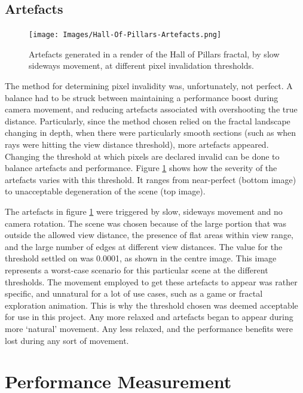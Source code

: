 \subsection{Artefacts}

\begin{figure}[ht]
	\centering
	\texttt{[image: Images/Hall-Of-Pillars-Artefacts.png]}
	\caption{Artefacts generated in a render of the Hall of Pillars fractal, by slow sideways movement, at different pixel invalidation thresholds.}
	\label{figure:hall-of-pillars-artefacts}
\end{figure}

The method for determining pixel invalidity was, unfortunately, not perfect. A balance had to be struck between maintaining a performance boost during camera movement, and reducing artefacts associated with overshooting the true distance. Particularly, since the method chosen relied on the fractal landscape changing in depth, when there were particularly smooth sections (such as when rays were hitting the view distance threshold), more artefacts appeared. Changing the threshold at which pixels are declared invalid can be done to balance artefacts and performance. Figure \ref{figure:hall-of-pillars-artefacts} shows how the severity of the artefacts varies with this threshold. It ranges from near-perfect (bottom image) to unacceptable degeneration of the scene (top image).\newline

The artefacts in figure \ref{figure:hall-of-pillars-artefacts} were triggered by slow, sideways movement and no camera rotation. The scene was chosen because of the large portion that was outside the allowed view distance, the presence of flat areas within view range, and the large number of edges at different view distances. The value for the threshold settled on was 0.0001, as shown in the centre image. This image represents a worst-case scenario for this particular scene at the different thresholds. The movement employed to get these artefacts to appear was rather specific, and unnatural for a lot of use cases, such as a game or fractal exploration animation. This is why the threshold chosen was deemed acceptable for use in this project. Any more relaxed and artefacts began to appear during more `natural' movement. Any less relaxed, and the performance benefits were lost during any sort of movement.

\section{Performance Measurement}

